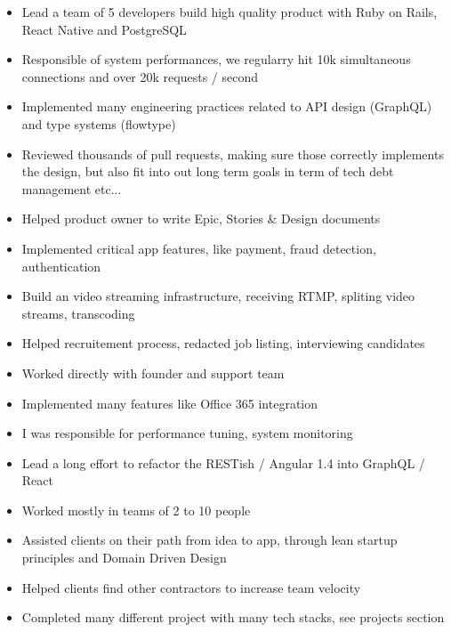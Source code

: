 \documentclass[10pt,a4paper,ragged2e,withhyper]{altacv}
\begin{document}
\begin{paracol}{2}


\begin{itemize}
\item Lead a team of 5 developers build high quality product with Ruby on Rails, React Native and PostgreSQL
\item Responsible of system performances, we regularry hit 10k simultaneous connections and over 20k requests / second
\item Implemented many engineering practices related to API design (GraphQL) and type systems (flowtype)
\item Reviewed thousands of pull requests, making sure those correctly implements the design, but also fit into out long term goals in term of tech debt management etc...
\item Helped product owner to write Epic, Stories \& Design documents
\item Implemented critical app features, like payment, fraud detection, authentication
\item Build an video streaming infrastructure, receiving RTMP, spliting video streams, transcoding
\item Helped recruitement process, redacted job listing, interviewing candidates
\end{itemize}

\divider

\begin{itemize}
\item Worked directly with founder and support team
\item Implemented many features like Office 365 integration
\item I was responsible for performance tuning, system monitoring
\item Lead a long effort to refactor the RESTish / Angular 1.4 into GraphQL / React
\end{itemize}

\divider

\begin{itemize}
  \item Worked mostly in teams of 2 to 10 people
  \item Assisted clients on their path from idea to app, through lean startup principles and Domain Driven Design
  \item Helped clients find other contractors to increase team velocity
  \item Completed many different project with many tech stacks, see projects section
\end{itemize}


\end{paracol}
\end{document}
